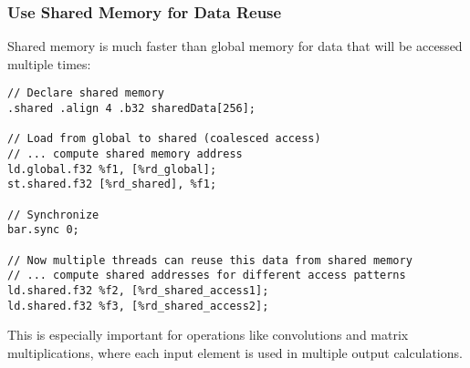 \subsubsection{Use Shared Memory for Data Reuse}

Shared memory is much faster than global memory for data that will be accessed multiple times:

\begin{lstlisting}[style=ptx]
// Declare shared memory
.shared .align 4 .b32 sharedData[256];

// Load from global to shared (coalesced access)
// ... compute shared memory address
ld.global.f32 %f1, [%rd_global];
st.shared.f32 [%rd_shared], %f1;

// Synchronize
bar.sync 0;

// Now multiple threads can reuse this data from shared memory
// ... compute shared addresses for different access patterns
ld.shared.f32 %f2, [%rd_shared_access1];
ld.shared.f32 %f3, [%rd_shared_access2];
\end{lstlisting}

This is especially important for operations like convolutions and matrix multiplications, where each input element is used in multiple output calculations.

